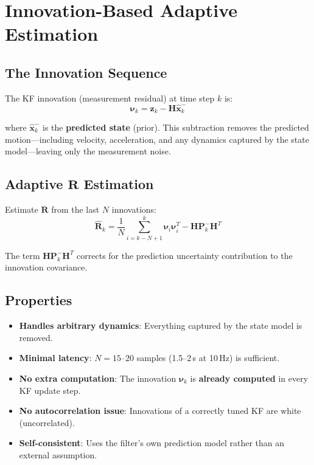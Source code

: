 \documentclass[11pt,a4paper]{article}
\begin{document}
\section{Innovation-Based Adaptive Estimation}

\subsection{The Innovation Sequence}

The KF innovation (measurement residual) at time step $k$ is:
\begin{equation}
    \boldsymbol{\nu}_k = \mathbf{z}_k - \mathbf{H}\hat{\mathbf{x}}_k^{-}
\end{equation}

where $\hat{\mathbf{x}}_k^{-}$ is the \textbf{predicted state} (prior). This subtraction removes the predicted motion---including velocity, acceleration, and any dynamics captured by the state model---leaving only the measurement noise.

\subsection{Adaptive $\mathbf{R}$ Estimation}

Estimate $\mathbf{R}$ from the last $N$ innovations:
\begin{equation}
    \boxed{\hat{\mathbf{R}}_k = \frac{1}{N}\sum_{i=k-N+1}^{k} \boldsymbol{\nu}_i \boldsymbol{\nu}_i^T - \mathbf{H}\mathbf{P}_k^{-}\mathbf{H}^T}
\end{equation}

The term $\mathbf{H}\mathbf{P}_k^{-}\mathbf{H}^T$ corrects for the prediction uncertainty contribution to the innovation covariance.

\subsection{Properties}

\begin{itemize}
    \item \textbf{Handles arbitrary dynamics}: Everything captured by the state model is removed.
    \item \textbf{Minimal latency}: $N = 15$--$20$ samples (1.5--2\,s at 10\,Hz) is sufficient.
    \item \textbf{No extra computation}: The innovation $\boldsymbol{\nu}_k$ is \textbf{already computed} in every KF update step.
    \item \textbf{No autocorrelation issue}: Innovations of a correctly tuned KF are white (uncorrelated).
    \item \textbf{Self-consistent}: Uses the filter's own prediction model rather than an external assumption.
\end{itemize}
\end{document}
